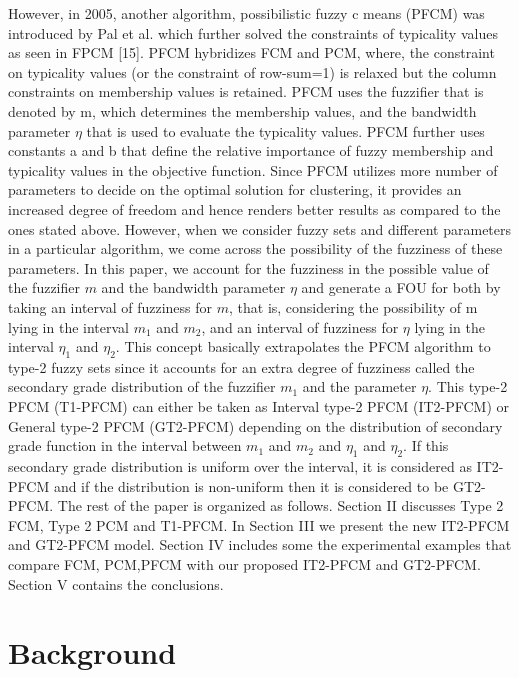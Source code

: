 \documentclass[journal, onecolumn]{IEEEtran}
\begin{document}
However, in 2005, another algorithm, possibilistic fuzzy c means (PFCM) was introduced by Pal et al. which further solved the constraints of typicality values as seen in FPCM [15]. PFCM hybridizes FCM and PCM,  where, the constraint on typicality values (or the constraint of row-sum=1) is relaxed but the column constraints on membership values is retained. PFCM uses the fuzzifier that is denoted by m, which determines the membership values, and the bandwidth parameter $\eta$ that is used  to evaluate the typicality values. PFCM further uses constants a and b that define the relative importance of fuzzy membership and typicality values in the objective function. Since PFCM utilizes more number of parameters to decide on the optimal solution for clustering, it provides an increased degree of freedom and hence renders better results as compared to the ones stated above. However, when we consider fuzzy sets and different parameters in a particular algorithm, we come across the possibility of the fuzziness of these parameters. 
In this paper, we account for the fuzziness in the possible value of the fuzzifier $m$ and the bandwidth parameter $\eta$ and generate a FOU for both by taking an interval of fuzziness for $m$, that is, considering the possibility of m lying in the interval $m_1$ and $m_2$, and an interval of fuzziness for $\eta$ lying in the interval $\eta_1$ and $\eta_2$. This concept basically extrapolates the PFCM algorithm to type-2 fuzzy sets since it accounts for an extra degree of fuzziness called the secondary grade distribution of the fuzzifier $m_1$ and the parameter $\eta$. This type-2 PFCM (T1-PFCM) can either be taken as Interval type-2 PFCM (IT2-PFCM) or General type-2 PFCM (GT2-PFCM) depending on the distribution of secondary grade function in the interval between $m_1$ and $m_2$ and $\eta_1$ and $\eta_2$. If this secondary grade distribution is uniform over the interval, it is considered as IT2-PFCM and if the distribution is non-uniform then it is considered to be GT2-PFCM. 
The rest of the paper is organized as follows. Section II discusses Type 2 FCM, Type 2 PCM and T1-PFCM. In Section III we present the new IT2-PFCM and GT2-PFCM model. Section IV includes some the experimental examples that compare FCM, PCM,PFCM with our proposed IT2-PFCM and GT2-PFCM. Section V contains the conclusions.



\section{Background}
\end{document}
